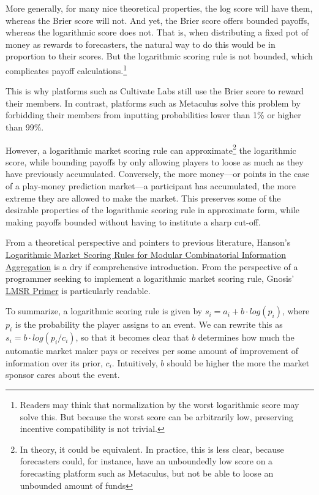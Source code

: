 \documentclass[]{article}
\begin{document}
More generally, for many nice theoretical properties, the log score will
have them, whereas the Brier score will not. And yet, the Brier score
offers bounded payoffs, whereas the logarithmic score does not. That is,
when distributing a fixed pot of money as rewards to forecasters, the
natural way to do this would be in proportion to their scores. But the
logarithmic scoring rule is not bounded, which complicates payoff
calculations.\footnote{Readers may think that normalization by the worst
  logarithmic score may solve this. But because the worst score can be
  arbitrarily low, preserving incentive compatibility is not trivial.}

This is why platforms such as Cultivate Labs still use the Brier score
to reward their members. In contrast, platforms such as Metaculus solve
this problem by forbidding their members from inputting probabilities
lower than 1\% or higher than 99\%.

However, a logarithmic market scoring rule can
approximate\footnote{In theory, it could be equivalent. In practice, this is less clear, because forecasters could, for instance, have an unboundedly low score on a forecasting platform such as Metaculus, but not be able to loose an unbounded amount of funds}
the logarithmic score, while bounding payoffs by only allowing players
to loose as much as they have previously accumulated. Conversely, the
more money---or points in the case of a play-money prediction market---a
participant has accumulated, the more extreme they are allowed to make
the market. This preserves some of the desirable properties of the
logarithmic scoring rule in approximate form, while making payoffs
bounded without having to institute a sharp cut-off.

From a theoretical perspective and pointers to previous literature,
Hanson's \href{https://mason.gmu.edu/~rhanson/mktscore.pdf}{Logarithmic
Market Scoring Rules for Modular Combinatorial Information Aggregation}
is a dry if comprehensive introduction. From the perspective of a
programmer seeking to implement a logarithmic market scoring rule,
Gnosis'
\href{https://gnosis-pm-js.readthedocs.io/en/v1.3.0/lmsr-primer.html}{LMSR
Primer} is particularly readable.

To summarize, a logarithmic scoring rule is given by
\(s_i = a_i + b\cdot log(p_i)\), where \(p_i\) is the probability the
player assigns to an event. We can rewrite this as
\(s_i = b \cdot log(p_i / c_i)\), so that it becomes clear that \(b\)
determines how much the automatic market maker pays or receives per some
amount of improvement of information over its prior, \(c_i\).
Intuitively, \(b\) should be higher the more the market sponsor cares
about the event.
\end{document}
